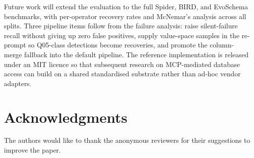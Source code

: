 \documentclass[conference,10pt,a4paper]{IEEEtran}
\begin{document}
Future work will extend the evaluation to the full Spider, BIRD, and
EvoSchema benchmarks, with per-operator recovery rates and McNemar's
analysis across all splits. Three pipeline items follow from the failure analysis: raise
silent-failure recall without giving up zero false positives, supply
value-space samples in the re-prompt so Q05-class detections become
recoveries, and promote the column-merge fallback into the default
pipeline. The reference implementation
is released under an MIT licence so that subsequent research on
MCP-mediated database access can build on a shared standardised
substrate rather than ad-hoc vendor adapters.

\section*{Acknowledgments}

The authors would like to thank the anonymous reviewers for their suggestions to improve the paper.
\end{document}
